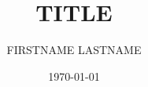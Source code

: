 \documentclass{article}
\begin{document}

\newcommand{\signature}[2][5cm]{%
  \begin{tabular}{@{}p{#1}@{}}
    #2 \\[2\normalbaselineskip] \hrule \\[0pt]
    {\small \textit{Signature}} \\[2\normalbaselineskip] \hrule \\[0pt]
    {\small \textit{Place, Date}}
  \end{tabular}
}
\title{TITLE} %
\author{
FIRSTNAME LASTNAME %
  }

\date{\small \today} %


\end{document}
